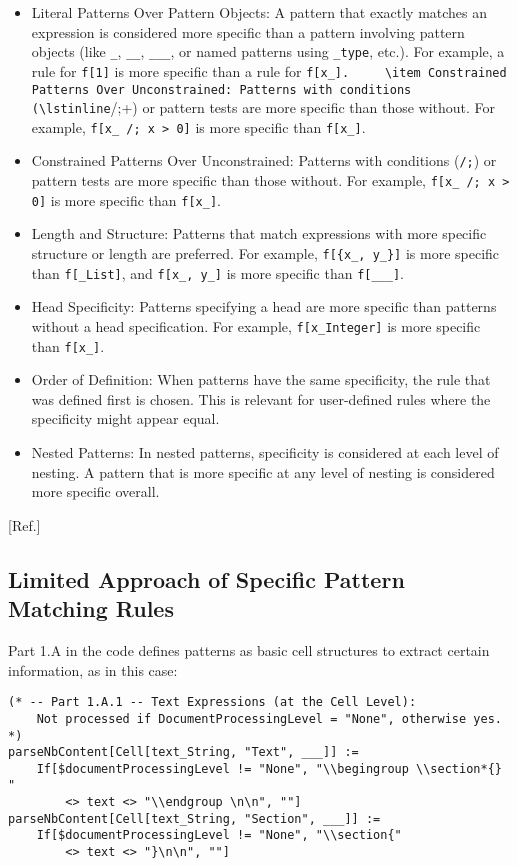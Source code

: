\begin{itemize}
    \item Literal Patterns Over Pattern Objects: A pattern that exactly matches an expression is considered more specific than a pattern involving pattern objects (like \lstinline+_+, \lstinline+__+, \lstinline+___+, or named patterns using \lstinline+_type+, etc.). For example, a rule for \lstinline+f[1]+ is more specific than a rule for \lstinline+f[x_].
    \item Constrained Patterns Over Unconstrained: Patterns with conditions (\lstinline+/;+) or pattern tests are more specific than those without. For example, \lstinline+f[x_ /; x > 0]+ is more specific than \lstinline+f[x_]+.
    \item Constrained Patterns Over Unconstrained: Patterns with conditions (\lstinline+/;+) or pattern tests are more specific than those without. For example, \lstinline+f[x_ /; x > 0]+ is more specific than \lstinline+f[x_]+.
    \item Length and Structure: Patterns that match expressions with more specific structure or length are preferred. For example, \lstinline+f[{x_, y_}]+ is more specific than \lstinline+f[_List]+, and \lstinline+f[x_, y_]+ is more specific than \lstinline+f[___]+.
    \item Head Specificity: Patterns specifying a head are more specific than patterns without a head specification. For example, \lstinline+f[x_Integer]+ is more specific than \lstinline+f[x_]+.
    \item Order of Definition: When patterns have the same specificity, the rule that was defined first is chosen. This is relevant for user-defined rules where the specificity might appear equal.
    \item Nested Patterns: In nested patterns, specificity is considered at each level of nesting. A pattern that is more specific at any level of nesting is considered more specific overall.
\end{itemize}

[Ref.]

\subsection{Limited Approach of Specific Pattern Matching Rules}

Part 1.A in the code defines patterns as basic cell structures to extract certain information, as in this case:

\begin{verbatim}
(* -- Part 1.A.1 -- Text Expressions (at the Cell Level): 
    Not processed if DocumentProcessingLevel = "None", otherwise yes. *)
parseNbContent[Cell[text_String, "Text", ___]] := 
    If[$documentProcessingLevel != "None", "\\begingroup \\section*{} " 
        <> text <> "\\endgroup \n\n", ""]
parseNbContent[Cell[text_String, "Section", ___]] := 
    If[$documentProcessingLevel != "None", "\\section{" 
        <> text <> "}\n\n", ""]
\end{verbatim}

